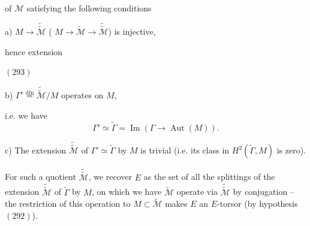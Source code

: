 

of $\mathcal M$ satisfying the following conditions

\par a) $M\longrightarrow\widetilde{\widetilde{\mathcal M}}$ ( $M\longrightarrow\widetilde{\mathcal M}\longrightarrow\widetilde{\widetilde{\mathcal M}}$) is injective,

\par {}

\par hence extension

\par $(293)$\quad
{}

\par b)  $\Gamma'\overset{\mathrm{dfn}}{=}\widetilde{\widetilde{\mathcal M}}/M$ operates \uline{} on $M$,

\par i.e. we have
\[
\Gamma'\simeq\widetilde\Gamma=\operatorname{Im}(\Gamma\longrightarrow\operatorname{Aut}(M)).
\]

\par c) The extension $\widetilde{\widetilde{\mathcal M}}$ of $\Gamma'\simeq\widetilde\Gamma$ by $M$ is trivial (i.e. its class in $H^2(\widetilde\Gamma,M)$ is zero).

\par For such a quotient $\widetilde{\widetilde{\mathcal M}}$, we recover $E$ as the set of all the splittings of the extension $\widetilde{\widetilde{\mathcal M}}$ of $\widetilde\Gamma$ by $M$,  on which we have $\widetilde{\mathcal M}$ operate via $\widetilde{\widetilde{\mathcal M}}$ by conjugation -- the restriction of this operation to $M\subset\widetilde{\mathcal M}$ makes $E$ an $E$-torsor (by hypothesis $(292)$).


